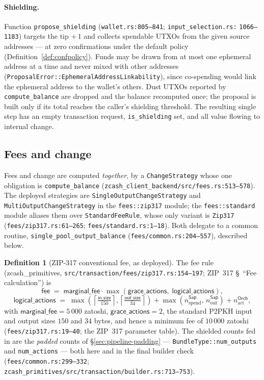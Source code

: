\documentclass[11pt,a4paper]{article}
\theoremstyle{definition}
\newtheorem{definition}[theorem]{Definition}
\begin{document}
\paragraph{Shielding.} Function \texttt{propose\_shielding}
(\texttt{wallet.rs:805--841}; \texttt{input\_selection.rs:}\allowbreak%
\texttt{1066--1183})
targets the tip $+\,1$ and collects spendable UTXOs from the given source
addresses --- at zero confirmations under the default policy
(Definition~\ref{def:confpolicy}). Funds may be drawn from at most one
ephemeral address at a time and never mixed with other addresses
(\texttt{ProposalError::EphemeralAddressLinkability}), since co-spending
would link the ephemeral address to the wallet's others. Dust UTXOs reported
by \texttt{compute\_balance} are dropped and the balance recomputed once; the
proposal is built only if its total reaches the caller's shielding
threshold. The resulting single step has an empty transaction request,
\texttt{is\_shielding} set, and all value flowing to internal change.

\subsection{Fees and change}\label{sec:pipeline-fees}

Fees and change are computed \emph{together}, by a \texttt{ChangeStrategy}
whose one obligation is \texttt{compute\_balance}
(\texttt{zcash\_client\_backend/src/fees.rs:513--578}). The deployed
strategies are \texttt{SingleOutputChangeStrategy} and
\texttt{MultiOutputChangeStrategy} in the \texttt{fees::zip317} module; the
\texttt{fees::standard} module aliases them over \texttt{StandardFeeRule},
whose only variant is \texttt{Zip317}
(\texttt{fees/zip317.rs:61--265}; \texttt{fees/standard.rs:1--18}). Both
delegate to a common routine, \texttt{single\_pool\_output\_balance}
(\texttt{fees/common.rs:204--557}), described below.

\begin{definition}[ZIP-317 conventional fee, as deployed]\label{def:zip317-fee}
The fee rule (\textsf{zcash\_primitives},
\texttt{src/transaction/fees/zip317.rs:154--197}; ZIP~317
\S~``Fee calculation'') is
\[
\mathsf{fee} \;=\; \mathsf{marginal\_fee} \cdot
\max(\mathsf{grace\_actions},\; \mathsf{logical\_actions}),
\]
\[
\mathsf{logical\_actions} \;=\;
\max\!\left(\left\lceil \tfrac{\mathsf{in\_size}}{150} \right\rceil,
\left\lceil \tfrac{\mathsf{out\_size}}{34} \right\rceil\right)
+ \max(n^{\mathsf{Sap}}_{\mathrm{spend}},\, n^{\mathsf{Sap}}_{\mathrm{out}})
+ n^{\mathsf{Orch}}_{\mathrm{act}},
\]
with $\mathsf{marginal\_fee} = 5\,000$ zatoshi,
$\mathsf{grace\_actions} = 2$, the standard P2PKH input and output sizes
$150$ and $34$ bytes, and hence a minimum fee of $10\,000$ zatoshi
(\texttt{fees/zip317.rs:19--40}; the ZIP~317 parameter table). The shielded
counts fed in are the \emph{padded} counts of
\S\ref{sec:pipeline-padding} --- \texttt{BundleType::num\_outputs} and
\texttt{num\_actions} --- both here and in the final builder check
(\texttt{fees/common.rs:299--332};
\texttt{zcash\_primitives/src/transaction/builder.rs:713--753}).
\end{definition}
\end{document}
